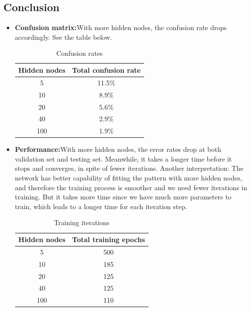 \documentclass{article}
\begin{document}
{    \subsection*{Conclusion}
    {
        \begin{itemize}
            \item \textbf{Confusion matrix:}\quad With more hidden nodes, the confusion rate drops accordingly. See the table below. 
            \begin{table}[htb!]
                \centering
                \begin{tabular}{|c|c|}
                \hline
                Hidden nodes & Total confusion rate \\
                \hline
                5 & 11.5\% \\
                \hline
                10 & 8.9\% \\
                \hline
                20 & 5.6\% \\
                \hline
                40 & 2.9\% \\
                \hline
                100 & 1.9\% \\
                \hline
                \end{tabular}
                \caption{Confusion rates}
            \end{table}

            \item \textbf{Performance:}\quad With more hidden nodes, the error rates drop at both validation set and testing set. Meanwhile, it takes a longer time before it stops and converges, in spite of fewer iterations. Another interpretation: The network has better capability of fitting the pattern with more hidden nodes, and therefore the training process is smoother and we need fewer iterations in training. But it takes more time since we have much more parameters to train, which leads to a longer time for each iteration step. 
            \begin{table}[htb!]
                \centering
                \begin{tabular}{|c|c|}
                \hline
                Hidden nodes & Total training epochs \\
                \hline
                5 & 500 \\
                \hline
                10 & 185 \\
                \hline
                20 & 125 \\
                \hline
                40 & 125 \\
                \hline
                100 & 110 \\
                \hline
                \end{tabular}
                \caption{Training iterations}
            \end{table}


\end{itemize}}}
\end{document}
